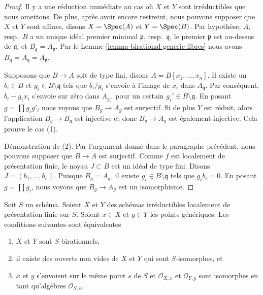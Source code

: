 \begin{proof}
Il y a une réduction immédiate au cas où $X$ et $Y$ sont irréductibles
que nous omettons. De plus, après avoir encore restreint, nous pouvons
supposer que $X$ et $Y$ sont affines,
disons $X = \Spec(A)$ et $Y = \Spec(B)$. Par hypothèse, $A$, resp.\ $B$
a un unique idéal premier minimal $\mathfrak p$, resp.\ $\mathfrak q$,
le premier $\mathfrak p$
est au-dessus de $\mathfrak q$, et $B_\mathfrak q = A_\mathfrak p$.
Par le Lemme \ref{lemma-birational-generic-fibres} nous avons $B_\mathfrak q = A_\mathfrak q = A_\mathfrak p$.

\medskip\noindent
Supposons que $B \to A$ soit de type fini, disons $A = B[x_1, \ldots, x_n]$.
Il existe un $b_i \in B$ et $g_i \in B \setminus \mathfrak q$ tels que $b_i/g_i$ s'envoie
à l'image de $x_i$ dans $A_\mathfrak q$. Par conséquent,
$b_i  - g_ix_i$ s'envoie sur zéro dans $A_{g_i'}$ pour
un certain $g_i' \in B \setminus \mathfrak q$. En posant $g = \prod g_i g'_i$ nous voyons que
$B_g \to A_g$ est surjectif. Si de plus $Y$ est réduit, alors
l'application $B_g \to B_\mathfrak q$ est injective et donc $B_g \to A_g$
est également injective. Cela prouve le cas (1).

\medskip\noindent
Démonstration de (2). Par l'argument donné dans le paragraphe précédent,
nous pouvons supposer que $B \to A$ est surjectif. Comme $f$
est localement de présentation finie, le noyau $J \subset B$
est un idéal de type fini. Disons $J = (b_1, \ldots, b_r)$. Puisque
$B_\mathfrak q = A_\mathfrak q$, il existe $g_i \in B \setminus \mathfrak q$ tels que $g_i b_i = 0$.
En posant $g = \prod g_i$, nous voyons que $B_g \to A_g$ est un
isomorphisme.
\end{proof}

\begin{lemma}
\label{lemma-criterion-birational-finite-presentation}
Soit $S$ un schéma. Soient $X$ et $Y$ des schémas irréductibles
localement de présentation finie sur $S$. Soient $x \in X$ et $y \in Y$
les points génériques. Les conditions suivantes sont équivalentes
\begin{enumerate}
\item $X$ et $Y$ sont $S$-birationnels,
\item il existe des ouverts non vides de $X$ et $Y$
qui sont $S$-isomorphes, et
\item $x$ et $y$ s'envoient sur le même point
$s$ de $S$ et $\mathcal{O}_{X, x}$ et $\mathcal{O}_{Y, y}$ sont isomorphes
en tant qu'algèbres $\mathcal{O}_{S, s}$.
\end{enumerate}
\end{lemma}

